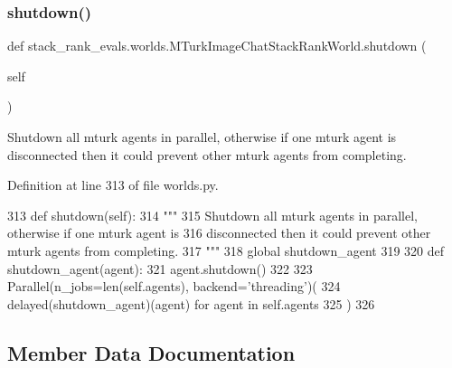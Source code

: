 \mbox{\label{classstack__rank__evals_1_1worlds_1_1MTurkImageChatStackRankWorld_ab273e639ff15f9c20a49d478abb4aa31}} 
\subsubsection{\texorpdfstring{shutdown()}{shutdown()}}
{\footnotesize\ttfamily def stack\+\_\+rank\+\_\+evals.\+worlds.\+M\+Turk\+Image\+Chat\+Stack\+Rank\+World.\+shutdown (\begin{DoxyParamCaption}\item[{}]{self }\end{DoxyParamCaption})}

\begin{DoxyVerb}Shutdown all mturk agents in parallel, otherwise if one mturk agent is
disconnected then it could prevent other mturk agents from completing.
\end{DoxyVerb}
 

Definition at line 313 of file worlds.\+py.


\begin{DoxyCode}
313     \textcolor{keyword}{def }shutdown(self):
314         \textcolor{stringliteral}{"""}
315 \textcolor{stringliteral}{        Shutdown all mturk agents in parallel, otherwise if one mturk agent is}
316 \textcolor{stringliteral}{        disconnected then it could prevent other mturk agents from completing.}
317 \textcolor{stringliteral}{        """}
318         \textcolor{keyword}{global} shutdown\_agent
319 
320         \textcolor{keyword}{def }shutdown\_agent(agent):
321             agent.shutdown()
322 
323         Parallel(n\_jobs=len(self.agents), backend=\textcolor{stringliteral}{'threading'})(
324             delayed(shutdown\_agent)(agent) \textcolor{keywordflow}{for} agent \textcolor{keywordflow}{in} self.agents
325         )
326 \end{DoxyCode}


\subsection{Member Data Documentation}
\mbox{\label{classstack__rank__evals_1_1worlds_1_1MTurkImageChatStackRankWorld_a197cd340a59af888ff5028375159c797}} 
